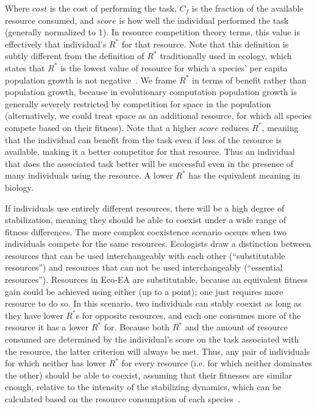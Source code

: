 Where $cost$ is the cost of performing the task, $C_f$ is the fraction of the available resource consumed, and $score$ is how well the individual performed the task (generally normalized to 1). In resource competition theory terms, this value is effectively that individual's $R^*$ for that resource. Note that this definition is subtly different from the definition of $R^*$ traditionally used in ecology, which states that $R^*$ is the lowest value of resource for which a species' per capita population growth is not negative~\cite{chase_ecological_2003}. We frame $R^*$ in terms of benefit rather than population growth, because in evolutionary computation population growth is generally severely restricted by competition for space in the population (alternatively, we could treat space as an additional resource, for which all species compete based on their fitness). Note that a higher $score$ reduces $R^*$, meaning that the individual can benefit from the task even if less of the resource is available, making it a better competitor for that resource. Thus an individual that does the associated task better will be successful even in the presence of many individuals using the resource. A lower $R^*$ has the equivalent meaning in biology.

If individuals use entirely different resources, there will be a high degree of stabilization, meaning they should be able to coexist under a wide range of fitness differences. The more complex coexistence scenario occurs when two individuals compete for the same resources. Ecologists draw a distinction between resources that can be used interchangeably with each other (``substitutable resources'') and resources that can not be used interchangeably (``essential resources''). Resources in Eco-EA are substitutable, because an equivalent fitness gain could be achieved using either (up to a point); one just requires more resource to do so.  In this scenario, two individuals can stably coexist as long as they have lower $R^*$s for opposite resources, and each one consumes more of the resource it has a lower $R^*$ for. Because both $R^*$ and the amount of resource consumed are determined by the individual's score on the task associated with the resource, the latter criterion will always be met. Thus, any pair of individuals for which neither has lower $R^*$ for every resource (i.e. for which neither dominates the other) should be able to coexist, assuming that their fitnesses are similar enough, relative to the intensity of the stabilizing dynamics, which can be calculated based on the resource consumption of each species~\cite{letten_linking_2017}.

